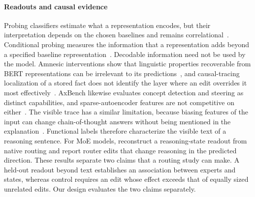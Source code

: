 \paragraph{Readouts and causal evidence}
Probing classifiers estimate what a representation encodes, but their interpretation depends on the chosen baselines and remains correlational~\citep{belinkov2022probing}.
%
Conditional probing measures the information that a representation adds beyond a specified baseline representation~\citep{hewitt2021conditional}.
%
Decodable information need not be used by the model.
%
Amnesic interventions show that linguistic properties recoverable from BERT representations can be irrelevant to its predictions~\citep{elazar2021amnesic}, and causal-tracing localization of a stored fact does not identify the layer where an edit overrides it most effectively~\citep{hase2023localization}.
%
AxBench likewise evaluates concept detection and steering as distinct capabilities, and sparse-autoencoder features are not competitive on either~\citep{wu2025axbench}.
%
The visible trace has a similar limitation, because biasing features of the input can change chain-of-thought answers without being mentioned in the explanation~\citep{turpin2023language}.
%
Functional labels therefore characterize the visible text of a reasoning sentence.
%
For MoE models, \citet{chen2026beyond} reconstruct a reasoning-state readout from native routing and report router edits that change reasoning in the predicted direction.
%
These results separate two claims that a routing study can make.
%
A held-out readout beyond text establishes an association between experts and states, whereas control requires an edit whose effect exceeds that of equally sized unrelated edits.
%
Our design evaluates the two claims separately.
%

